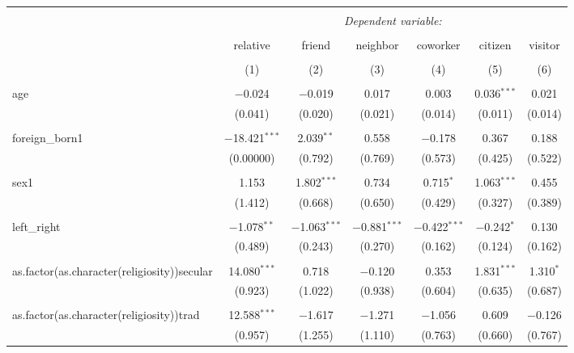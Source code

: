 \documentclass[12pt,letterpaper]{article}
\begin{document}
\begin{table}[!htbp] \centering 
	\caption{} 
	\label{} 
	\footnotesize
	\begin{adjustbox}{max width=\textwidth}
	\begin{tabular}{@{\extracolsep{5pt}}lcccccc} 
		\\[-1.8ex]\hline 
		\hline \\[-1.8ex] 
		& \multicolumn{6}{c}{\textit{Dependent variable:}} \\ 
		\cline{2-7} 
		\\[-1.8ex] & relative & friend & neighbor & coworker & citizen & visitor \\ 
		\\[-1.8ex] & (1) & (2) & (3) & (4) & (5) & (6)\\ 
		\hline \\[-1.8ex] 
		age & $-$0.024 & $-$0.019 & 0.017 & 0.003 & 0.036$^{***}$ & 0.021 \\ 
		& (0.041) & (0.020) & (0.021) & (0.014) & (0.011) & (0.014) \\ 
		& & & & & & \\ 
		foreign\_born1 & $-$18.421$^{***}$ & 2.039$^{**}$ & 0.558 & $-$0.178 & 0.367 & 0.188 \\ 
		& (0.00000) & (0.792) & (0.769) & (0.573) & (0.425) & (0.522) \\ 
		& & & & & & \\ 
		sex1 & 1.153 & 1.802$^{***}$ & 0.734 & 0.715$^{*}$ & 1.063$^{***}$ & 0.455 \\ 
		& (1.412) & (0.668) & (0.650) & (0.429) & (0.327) & (0.389) \\ 
		& & & & & & \\ 
		left\_right & $-$1.078$^{**}$ & $-$1.063$^{***}$ & $-$0.881$^{***}$ & $-$0.422$^{***}$ & $-$0.242$^{*}$ & 0.130 \\ 
		& (0.489) & (0.243) & (0.270) & (0.162) & (0.124) & (0.162) \\ 
		& & & & & & \\ 
		as.factor(as.character(religiosity))secular & 14.080$^{***}$ & 0.718 & $-$0.120 & 0.353 & 1.831$^{***}$ & 1.310$^{*}$ \\ 
		& (0.923) & (1.022) & (0.938) & (0.604) & (0.635) & (0.687) \\ 
		& & & & & & \\ 
		as.factor(as.character(religiosity))trad & 12.588$^{***}$ & $-$1.617 & $-$1.271 & $-$1.056 & 0.609 & $-$0.126 \\ 
		& (0.957) & (1.255) & (1.110) & (0.763) & (0.660) & (0.767) \\ 

\end{tabular}
\end{adjustbox}
\end{table}
\end{document}
